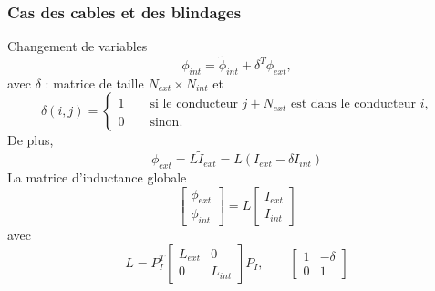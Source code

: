 \begin{frame}
\frametitle{Cas des cables et des blindages}
Changement de variables
\begin{equation}
\phi_{int} = \tilde{\phi}_{int} +\delta^T \phi_{ext},
\end{equation}
avec $\delta$ : matrice de taille $N_{ext}\times N_{int}$ et
\begin{equation}
\delta(i,j)=
\begin{cases}
1 \qquad \text{si le conducteur $j+N_{ext}$ est dans le conducteur $i$,} \\
0 \qquad \text{sinon.}
\end{cases}
\end{equation}
De plus, 
\begin{equation}
\phi_{ext} = L\tilde{I}_{ext}=L(I_{ext}-\delta I_{int})
\end{equation}
La matrice d'inductance globale
\[ \left[ \begin{array} {c}
\phi_{ext} \\
\phi_{int} \end{array}  \right]  = 
L
 \left[ \begin{array} {c}
I_{ext} \\
I_{int} \end{array}  \right] 
\] 
avec
\[ L = P_I^T \left[ \begin{array} {cc}
L_{ext} &0 \\
0 & L_{int} \end{array}  \right] P_I , \qquad 
\left[ \begin{array} {cc}
1 & -\delta \\
0 & 1 \end{array}  \right]
 \] 

\end{frame}

